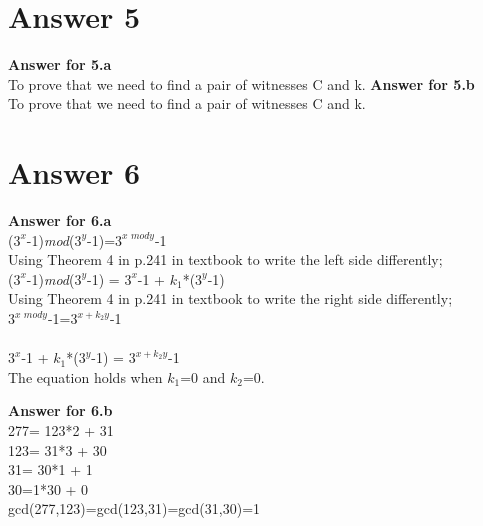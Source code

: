 \documentclass[12pt]{article}
\begin{document}
\section*{Answer 5}
\textbf{Answer for 5.a} \\
To prove that we need to find a pair of witnesses C and k.
\textbf{Answer for 5.b} \\
To prove that we need to find a pair of witnesses C and k.
\section*{Answer 6}
\textbf{Answer for 6.a} \\
($3^{x}$-1)\textit{mod}($3^{y}$-1)=$3^{\textit{x mody}}$-1 \\
Using Theorem 4 in p.241 in textbook to write the left side differently; \\
($3^{x}$-1)\textit{mod}($3^{y}$-1) = $3^{x}$-1 + $k_{1}$*($3^{y}$-1)\\
Using Theorem 4 in p.241 in textbook to write the right side differently; \\
$3^{\textit{x mody}}$-1=$3^{x+k_{2}y}$-1\\
\\
$3^{x}$-1 + $k_{1}$*($3^{y}$-1) = $3^{x+k_{2}y}$-1 \\
The equation holds when $k_{1}$=0 and $k_{2}$=0. 





\textbf{Answer for 6.b} \\
277= 123*2 + 31 \\
123= 31*3 + 30 \\
31= 30*1 + 1 \\
30=1*30 + 0 \\
gcd(277,123)=gcd(123,31)=gcd(31,30)=1 \\
\end{document}
